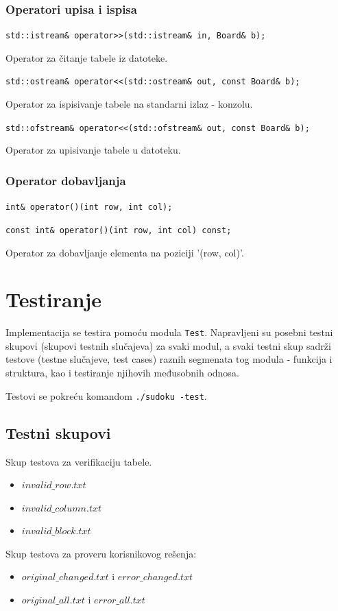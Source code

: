 \documentclass[a4paper]{article}
\begin{document}
    \subsubsection{Operatori upisa i ispisa}
    \par\texttt{std::istream\& operator>>(std::istream\& in, Board\& b);}
    \par Operator za čitanje tabele iz datoteke.
    \par\texttt{std::ostream\& operator<<(std::ostream\& out, const Board\& b);}
    \par Operator za ispisivanje tabele na standarni izlaz - konzolu.
    \par\texttt{std::ofstream\& operator<<(std::ofstream\& out, const Board\& b);}
    \par Operator za upisivanje tabele u datoteku. 

    \subsubsection{Operator dobavljanja}
    \par\texttt{int\& operator()(int row, int col);}
    \par\texttt{const int\& operator()(int row, int col) const;}
    \par Operator za dobavljanje elementa na poziciji '(row, col)'.
    
    \newpage
    \section{Testiranje}
    Implementacija se testira pomoću modula \texttt{Test}. Napravljeni su posebni testni skupovi (skupovi testnih slučajeva) za svaki modul, 
    a svaki testni skup sadrži testove (testne slučajeve, test cases) raznih segmenata tog modula - funkcija i struktura, kao i testiranje njihovih međusobnih odnosa.
    \par Testovi se pokreću komandom \texttt{./sudoku -test}.
    \subsection{Testni skupovi}
    {\parindent0pt
        Skup testova za verifikaciju tabele.
        \begin{itemize}
            \item $invalid\_row.txt$
            \item $invalid\_column.txt$
            \item $invalid\_block.txt$
        \end{itemize}
        \par Skup testova za proveru korisnikovog rešenja:
        \begin{itemize}
            \item $original\_changed.txt$ i $error\_changed.txt$
            \item $original\_all.txt$ i $error\_all.txt$
        \end{itemize}    
    }
\end{document}
